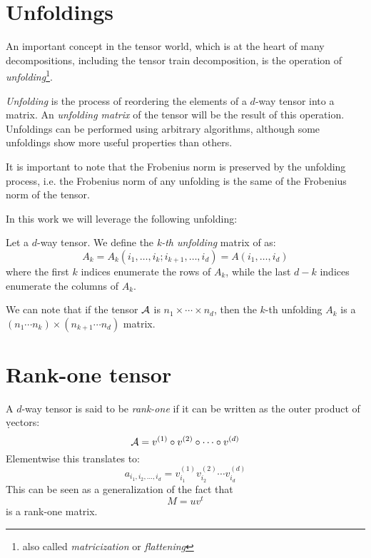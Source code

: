 
\section{Unfoldings}
An important concept in the tensor world, which is at the heart of many decompositions, including the tensor train decomposition, is the operation of \emph{unfolding}\footnote{also called \emph{matricization} or \emph{flattening}}.

\emph{Unfolding} is the process of reordering the elements of a $d$-way tensor into a matrix. An \emph{unfolding matrix} of the tensor will be the result of this operation. Unfoldings can be performed using arbitrary algorithms, although some unfoldings show more useful properties than others.

It is important to note that the Frobenius norm is preserved by the unfolding process, i.e. the Frobenius norm of any unfolding is the same of the Frobenius norm of the tensor.

In this work we will leverage the following unfolding:

\begin{Def}
  Let \A a $d$-way tensor. We define the \emph{k-th unfolding} matrix of \A as:
  \begin{equation} \label{def:unfolding}
    A_k = A_k(i_1,\dots,i_k;i_{k+1},\dots,i_d) = A(i_1,\dots,i_d)
  \end{equation}
where the first $k$ indices enumerate the rows of $A_k$, while the last $d - k$ indices enumerate the columns of $A_k$.
\end{Def}

We can note that if the tensor $\mathcal{A}$ is $n_1 \times \cdots \times n_d$, then the $k$-th unfolding $A_k$ is a $(n_1 \cdots n_k) \times (n_{k+1} \cdots n_d) $ matrix.

\section{Rank-one tensor}
A $d$-way tensor \A is said to be \emph{rank-one} if it can be written as the outer product of \d vectors:
\begin{equation}
  \mathcal{A} = v^{(1)} \circ v^{(2)} \circ \cdots \circ v^{(d)}
\end{equation}
Elementwise this translates to:
\begin{equation}
  a_{i_1,i_2,\ldots,i_d} = v_{i_1}^{(1)} v_{i_2}^{(2)} \cdots v_{i_d}^{(d)}
\end{equation}
This can be seen as a generalization of the fact that
\begin{equation*}
  M = u v^t
\end{equation*}
is a rank-one matrix.

